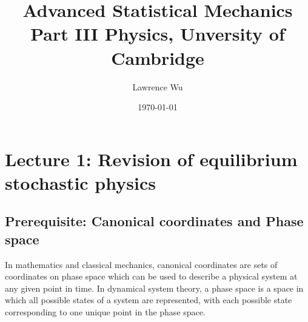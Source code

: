 \documentclass{report}
\title{\Huge{Advanced Statistical Mechanics}\\Part III Physics, Unversity of Cambridge}
\author{\huge{Lawrence Wu}}
\date{\today}
\begin{document}
\maketitle
\newpage%
\tableofcontents
\pagebreak
%
%
\chapter{Lecture 1: Revision of equilibrium stochastic physics}
\section{Prerequisite: Canonical coordinates and Phase space}
In mathematics and classical mechanics, canonical coordinates are sets of coordinates on phase space which can be used to describe a physical system at any given point in time. In dynamical system theory, a phase space is a space in which all possible states of a system are represented, with each possible state corresponding to one unique point in the phase space.
\end{document}
